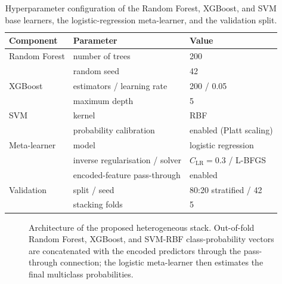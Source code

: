 \documentclass{elektr}
\begin{document}
\begin{table}[H]
\centering
\caption{Hyperparameter configuration of the Random Forest, XGBoost, and SVM base learners, the logistic-regression meta-learner, and the validation split.}
\label{tab:hyper}
\small
\begin{tabular}{lll}
\toprule
Component & Parameter & Value \\
\midrule
Random Forest & number of trees & 200 \\
 & random seed & 42 \\
XGBoost & estimators / learning rate & 200 / 0.05 \\
 & maximum depth & 5 \\
SVM & kernel & RBF \\
 & probability calibration & enabled (Platt scaling) \\
Meta-learner & model & logistic regression \\
 & inverse regularisation / solver & $C_{\mathrm{LR}}=0.3$ / L-BFGS \\
 & encoded-feature pass-through & enabled \\
Validation & split / seed & 80:20 stratified / 42 \\
 & stacking folds & 5 \\
\bottomrule
\end{tabular}
\end{table}

\begin{figure}[H]
\centering
{}
\caption{Architecture of the proposed heterogeneous stack. Out-of-fold Random Forest, XGBoost, and SVM-RBF class-probability vectors are concatenated with the encoded predictors through the pass-through connection; the logistic meta-learner then estimates the final multiclass probabilities.}
\label{fig:stack}
\end{figure}
\end{document}
